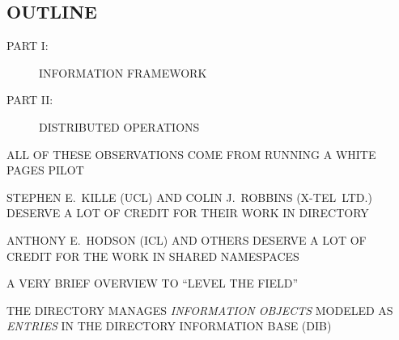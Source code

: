 


\begin{bwslide}
\part*	{OUTLINE}\bf

\begin{description}
\item[PART I:]		INFORMATION FRAMEWORK

\item[PART II:]		DISTRIBUTED OPERATIONS
\end{description}
\end{bwslide}


\begin{bwslide}

\begin{nrtc}
\item	ALL OF THESE OBSERVATIONS COME FROM RUNNING A WHITE PAGES PILOT

\item	STEPHEN E.~KILLE (UCL) AND COLIN J.~ROBBINS (X-TEL~LTD.)
	DESERVE A LOT OF CREDIT FOR THEIR WORK IN DIRECTORY

\item	ANTHONY E.~HODSON (ICL) AND OTHERS DESERVE A LOT OF CREDIT FOR
	THE WORK IN SHARED NAMESPACES
\end{nrtc}
\end{bwslide}


\begin{bwslide}

\begin{nrtc}
\item	A VERY BRIEF OVERVIEW TO ``LEVEL THE FIELD''

\item	THE DIRECTORY MANAGES \emph{INFORMATION OBJECTS} MODELED AS
	\emph{ENTRIES} IN THE DIRECTORY INFORMATION BASE (DIB)
\end{nrtc}
\end{bwslide}




